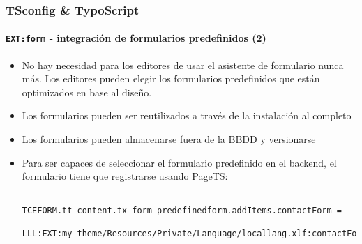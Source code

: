 \begin{frame}[fragile]
	\frametitle{TSconfig \& TypoScript}
	\framesubtitle{\texttt{EXT:form} - integración de formularios predefinidos (2)}

	\lstset{basicstyle=\tiny\ttfamily}

	\begin{itemize}

		\item No hay necesidad para los editores de usar el asistente de formulario nunca más.
			Los editores pueden elegir los formularios predefinidos que están optimizados en base al diseño.

		\item Los formularios pueden ser reutilizados a través de la instalación al completo

		\item Los formularios pueden almacenarse fuera de la BBDD y versionarse

		\item Para ser capaces de seleccionar el formulario predefinido en el backend,
			el formulario tiene que registrarse usando PageTS:

		\begin{lstlisting}
			TCEFORM.tt_content.tx_form_predefinedform.addItems.contactForm =
			  LLL:EXT:my_theme/Resources/Private/Language/locallang.xlf:contactForm
		\end{lstlisting}

	\end{itemize}

\end{frame}

